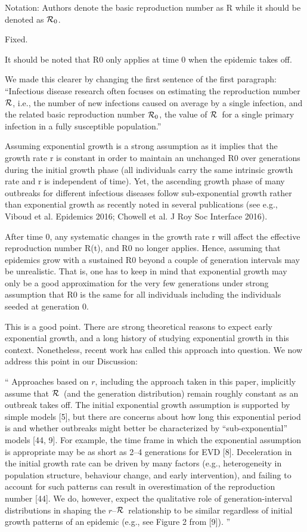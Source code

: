 \documentclass[12pt]{article}
\newcommand{\rR}{\mbox{$r$--$\cal R$}}
\newcommand{\RR}{\ensuremath{{\cal R}}}
\newcommand{\Rx}[1]{\ensuremath{{\cal R}_{#1}}}
\newcommand{\Ro}{\Rx{0}}
\newcommand{\revtext}{\textsf}
\begin{document}
\revtext{Notation: Authors denote the basic reproduction number as R while it should be denoted as \Ro.}

Fixed.

\revtext{It should be noted that R0 only applies at time 0 when the epidemic takes off.}

We made this clearer by changing the first sentence of the first paragraph: ``Infectious disease research often focuses on estimating the reproduction number \RR, i.e., the number of new infections caused on average by a single infection, and the related basic reproduction number \Ro, the value of \RR\ for a single primary infection in a fully susceptible population.''

\revtext{Assuming exponential growth is a strong assumption as it
implies that the growth rate r is constant in order to maintain an
unchanged R0 over generations during the initial growth phase (all
individuals carry the same intrinsic growth rate and r is independent
of time). Yet, the ascending growth phase of many outbreaks for
different infectious diseases follow sub-exponential growth rather
than exponential growth as recently noted in several publications
(see e.g.,  Viboud et al. Epidemics 2016; Chowell et al. J Roy Soc
Interface 2016).}

\revtext{After time 0, any systematic changes in the growth rate r will
affect the effective reproduction number R(t), and R0 no longer
applies.  Hence, assuming that epidemics grow with a sustained R0
beyond a couple of generation intervals may be unrealistic. That is,
one has to keep in mind that exponential growth may only be a good
approximation for the very few generations under strong assumption
that R0 is the same for all individuals including the individuals
seeded at generation 0.}

This is a good point. There are strong theoretical reasons to expect early exponential growth, and a long history of studying exponential growth in this context. Nonetheless, recent work has called this approach into question. We now address this point in our Discussion:

``
Approaches based on $r$, including the approach taken in this paper, implicitly assume that \RR\ (and the generation distribution) remain roughly constant as an outbreak takes off.
The initial exponential growth assumption is supported by simple models [5], but there are concerns about how long this exponential period is and whether outbreaks might better be characterized by ``sub-exponential'' models [44, 9].
For example, the time frame in which the exponential assumption is appropriate may be as short as 2--4 generations for EVD [8].
Deceleration in the initial growth rate can be driven by many factors (e.g., heterogeneity in population structure, behaviour change, and early intervention), and failing to account for such patterns can result in overestimation of the reproduction number [44].
We do, however, expect the qualitative role of generation-interval distributions in shaping the \rR\ relationship to be similar regardless of initial growth patterns of an epidemic (e.g., see Figure 2 from [9]).
''
\end{document}
